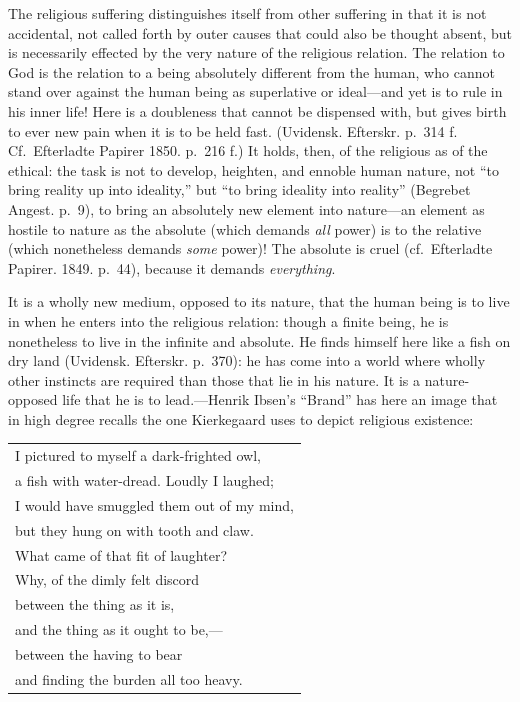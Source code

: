 \documentclass[12pt,a4paper]{book}
\newcommand{\opage}[1]{\marginnote{\footnotesize\textit{[#1]}}}
\begin{document}
The religious suffering distinguishes itself from other suffering in that
it is not accidental, not called forth by outer causes that could also be
thought absent, but is necessarily effected by the very nature of the
religious relation. The relation to God is the relation to a being
absolutely different from the human, who cannot stand over against the
human being as superlative or ideal---and yet is to rule in his inner
life! Here is a doubleness that cannot be dispensed with, but gives birth
to ever new pain when it is to be held fast. (Uvidensk. Efterskr. p.~314
f. Cf.\ Efterladte Papirer 1850. p.~216 f.) It holds, then, of the
religious as of the ethical: the task is not to develop, heighten, and
ennoble human nature, not ``to bring reality up into ideality,'' but ``to
bring ideality into reality'' (Begrebet Angest. p.~9), to bring an
absolutely new element into nature---an element as hostile to nature as
the absolute (which demands \textit{all} power) is to the relative (which
nonetheless demands \textit{some} power)! The absolute is cruel (cf.\
Efterladte Papirer. 1849. p.~44), because it demands
\textit{everything}.

It is a wholly new medium, opposed to its nature, that the human being is
to live in when he enters into the religious relation: though a finite
being, he is nonetheless to live in the infinite and absolute. He finds
himself here like a fish on dry land (Uvidensk. Efterskr. p.~370): he
\opage{113}has come into a world where wholly other instincts are required
than those that lie in his nature. It is a nature-opposed life that he is
to lead.---Henrik Ibsen's ``Brand'' has here an image that in high degree
recalls the one Kierkegaard uses to depict religious existence:

\begin{center}\small\begin{tabular}{@{}l@{}}
I pictured to myself a dark-frighted owl,\\
a fish with water-dread. Loudly I laughed;\\
I would have smuggled them out of my mind,\\
but they hung on with tooth and claw.\\
What came of that fit of laughter?\\
Why, of the dimly felt discord\\
between the thing as it is,\\
and the thing as it ought to be,---\\
between the having to bear\\
and finding the burden all too heavy.
\end{tabular}\end{center}
\end{document}

